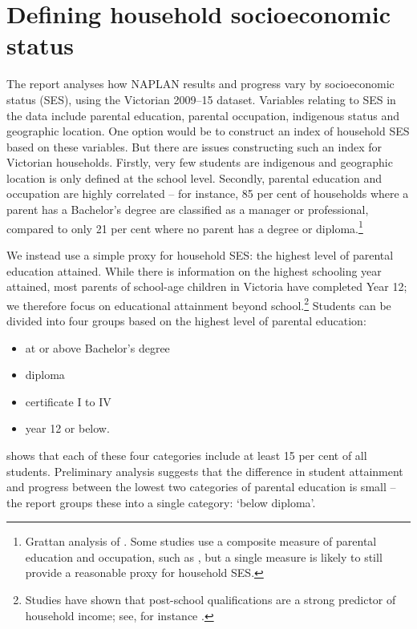 \section{Defining household socioeconomic status}

The report analyses how NAPLAN results and progress vary by socioeconomic status (SES), using the Victorian 2009--15 dataset. Variables relating to SES in the data include parental education, parental occupation, indigenous status and geographic location. One option would be to construct an index of household SES based on these variables. But there are issues constructing such an index for Victorian households. Firstly, very few students are indigenous and geographic location is only defined at the school level. Secondly, parental education and occupation are highly correlated -- for instance, 85 per cent of households where a parent has a Bachelor's degree are classified as a manager or professional, compared to only 21 per cent where no parent has a degree or diploma.\footnote{Grattan analysis of \textcite{vcaa2015}. Some studies use a composite measure of parental education and occupation, such as \textcite{marks2015,houng2015}, but a single measure is likely to still provide a reasonable proxy for household SES.}

We instead use a simple proxy for household SES: the highest level of parental education attained. While there is information on the highest schooling year attained, most parents of school-age children in Victoria have completed Year 12; we therefore focus on educational attainment beyond school.\footnote{Studies have shown that post-school qualifications are a strong predictor of household income; see, for instance \textcite{oecd2015}.} Students can be divided into four groups based on the highest level of parental education:
\begin{itemize}
\item at or above Bachelor's degree
\item diploma
\item certificate I to IV
\item year 12 or below.
\end{itemize}

 shows that each of these four categories include at least 15 per cent of all students. Preliminary analysis suggests that the difference in student attainment and progress between the lowest two categories of parental education is small -- the report groups these into a single category: `below diploma'.

